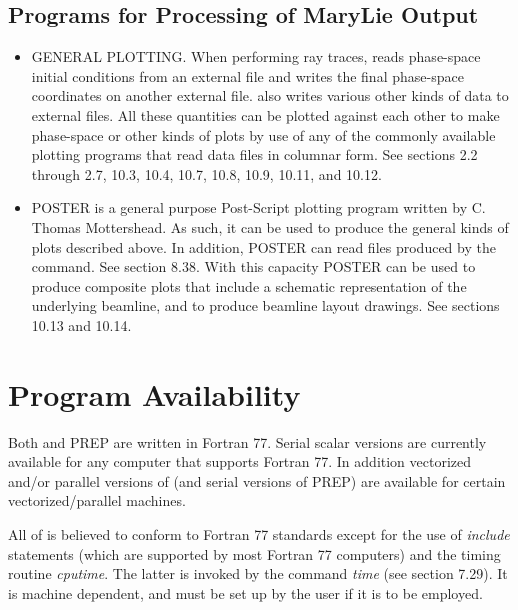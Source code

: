 \subsection{Programs for Processing of MaryLie Output}
\begin{itemize}
\item  GENERAL PLOTTING\@.  When performing ray traces, \Mary reads phase-space
         initial conditions from an external file and writes the final
         phase-space coordinates on another external file.  \Mary also
		 writes various other kinds of data to external files.  All these
		 quantities can be plotted against each other to make phase-space or
		 other kinds of plots by use of any of the commonly available plotting
		 programs that read data files in columnar form.  See sections 2.2
		 through 2.7, 10.3, 10.4, 10.7, 10.8, 10.9, 10.11, and 10.12.

\item  POSTER is a general purpose Post-Script plotting program written
by C. Thomas Mottershead.  As such, it can be used to produce the general
kinds of plots described above.  In addition, POSTER can read files
produced by the  command.  See section 8.38.  With this
capacity POSTER can be used to produce composite plots that include a
schematic representation of the underlying beamline, and to produce
beamline layout drawings.  See sections 10.13 and 10.14.
\end{itemize}

\section{Program Availability}
Both \Mary and PREP are written in {\sc Fortran 77}.  Serial scalar versions
are currently available for any computer that supports {\sc Fortran 77}.  In addition vectorized and/or parallel versions of \Mary (and
serial versions of PREP) are available for certain vectorized/parallel
machines.

All of  is believed to conform to Fortran 77 standards except for the use of {\em include} statements (which are supported by most Fortran 77 computers) and the timing routine {\em cputime}.  The latter is invoked by the \Mary command {\em time} (see section 7.29).  It is machine dependent, and must be set up by the user if it is to be employed.



